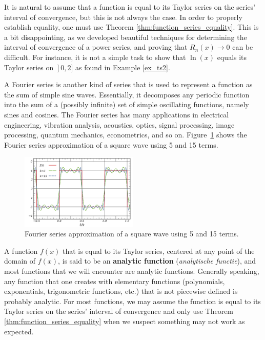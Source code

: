 \fi

It is natural to assume that a function is equal to its Taylor series on the series' interval of convergence, but this is not always the case. In order to properly establish equality, one must use Theorem \ref{thm:function_series_equality}. This is a bit disappointing, as we developed beautiful techniques for determining the interval of convergence of a power series, and proving that $R_n(x)\to 0$ can be difficult. For instance, it is not a simple task to show that $\ln (x)$ equals  its Taylor series on $\left.\right]0,2]$ as found in Example \ref{ex_ts2}.

\begin{remark}
A Fourier series is another kind of series that is used to represent a function as the sum of simple sine waves. Essentially, it decomposes any periodic function  into the sum of a (possibly infinite) set of simple oscillating functions, namely sines and cosines. The Fourier series has many  applications in electrical engineering, vibration analysis, acoustics, optics, signal processing, image processing, quantum mechanics, econometrics, and so on. Figure~\ref{fig_series_16} shows the Fourier series approximation of a square wave using 5 and 15 terms. 

\begin{figure}[H]
	\begin{center}
			\includegraphics[width=0.5\textwidth]{fig_series_16}
	\caption{ Fourier series approximation of a square wave using 5 and 15 terms.}
	\label{fig_series_16}
	\end{center}
\end{figure}


\end{remark}

A function $f(x)$ that is equal to its Taylor series, centered at any point of the domain of $f(x)$, is said to be an \textbf{analytic function} (\textit{analytische functie}), and most functions that we will encounter are analytic functions. Generally speaking, any function that one creates with elementary functions (polynomials, exponentials, trigonometric functions, etc.) that is not piecewise defined is probably analytic. For most functions, we may assume the function is equal to its Taylor series on the series' interval of convergence and only use Theorem \ref{thm:function_series_equality} when we suspect something may not work as expected.

